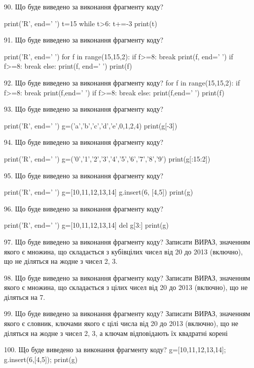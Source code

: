 \documentclass[11pt]{article}
\begin{document}

90. Що буде виведено за виконання фрагменту коду?

print('R', end=' ')
t=15
while t>6:
    t+=-3
print(t)



91. Що буде виведено за виконання фрагменту коду?

print('R', end=' ')
for f in range(15,15,2):
    if f>=8:
        break
        print(f, end=' ')
    if f>=8:
        break
    else:
        print(f, end=' ')
    print(f)


92. Що буде виведено за виконання фрагменту коду?
for f in range(15,15,2):
    if f>=8:
        break
        print(f,end=' ')
    if f>=8:
        break
    else:
        print(f,end=' ')
    print(f)


93. Що буде виведено за виконання фрагменту коду?

print('R', end=' ')
g=('a','b','c','d','e',0,1,2,4)
print(g[-3])



94. Що буде виведено за виконання фрагменту коду?

print('R', end=' ')
g=('0','1','2','3','4','5','6','7','8','9')
print(g[:15:2])



95. Що буде виведено за виконання фрагменту коду?

print('R', end=' ')
g=[10,11,12,13,14]
g.insert(6, [4,5])
print(g)



96. Що буде виведено за виконання фрагменту коду?

print('R', end=' ')
g=[10,11,12,13,14]
del g[3:]
print(g)



97. Що буде виведено за виконання фрагменту коду?
Записати ВИРАЗ, значенням якого є множина, що складається з кубівцілих чисел від 20 до 2013 (включно), що не діляться на жодне з чисел 2, 3.

98. Що буде виведено за виконання фрагменту коду?
Записати ВИРАЗ, значенням якого є множина, що складається з цілих чисел від 20 до 2013 (включно), що не діляться на 7.

99. Що буде виведено за виконання фрагменту коду?
Записати ВИРАЗ, значенням якого є словник, ключами якого є цілі числа від 20 до 2013 (включно), що не діляться на жодне з чисел 2, 3, а ключам відповідають їх квадратні корені 

100. Що буде виведено за виконання фрагменту коду?
g=[10,11,12,13,14]; g.insert(6,[4,5]); print(g)

\newpage
\end{document}
